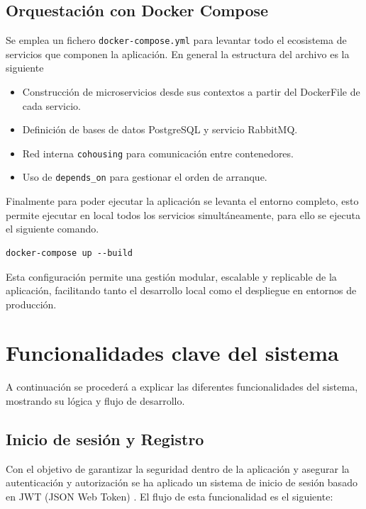 \subsection{Orquestación con Docker Compose}

Se emplea un fichero \texttt{docker-compose.yml}\cite{dockercompose} para levantar todo el ecosistema de servicios que componen la aplicación. En general la estructura del archivo es la siguiente
\begin{itemize}
  \item Construcción de microservicios desde sus contextos a partir del DockerFile de cada servicio.
  \item Definición de bases de datos PostgreSQL y servicio RabbitMQ.
  \item Red interna \texttt{cohousing} para comunicación entre contenedores.
  \item Uso de \texttt{depends\_on} para gestionar el orden de arranque.
\end{itemize}

Finalmente para poder ejecutar la aplicación se levanta el entorno completo, esto permite ejecutar en local todos los servicios simultáneamente, para ello se ejecuta el siguiente comando.

\begin{verbatim}
docker-compose up --build
\end{verbatim}

Esta configuración permite una gestión modular, escalable y replicable de la aplicación, facilitando tanto el desarrollo local como el despliegue en entornos de producción.


\section{Funcionalidades clave del sistema}

A continuación se procederá a explicar las diferentes funcionalidades del sistema, mostrando su lógica y flujo de desarrollo.

\subsection{Inicio de sesión y Registro}
Con el objetivo de garantizar la seguridad dentro de la aplicación y asegurar la autenticación y autorización se ha aplicado un sistema de inicio de sesión basado en JWT (JSON Web Token) \cite{jwt}. El flujo de esta funcionalidad es el siguiente: 
 
